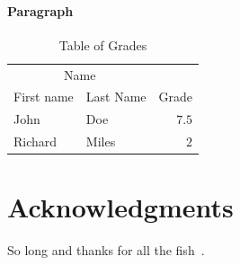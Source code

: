 \documentclass[fleqn,10pt]{SelfArx} %
\begin{document}
\lipsum[4] %

\paragraph{Paragraph} \lipsum[7] %

\begin{table}
    \caption{Table of Grades}
    \centering
    \begin{tabular}{llr}
        \toprule
        \multicolumn{2}{c}{Name} \\
        \cmidrule(r){1-2}
        First name & Last Name & Grade \\
        \midrule
        John & Doe & $7.5$ \\
        Richard & Miles & $2$ \\
        \bottomrule
    \end{tabular}
    \label{tab:label}
\end{table}

\section*{Acknowledgments} %


So long and thanks for all the fish~\cite{svm}.




\end{document}
